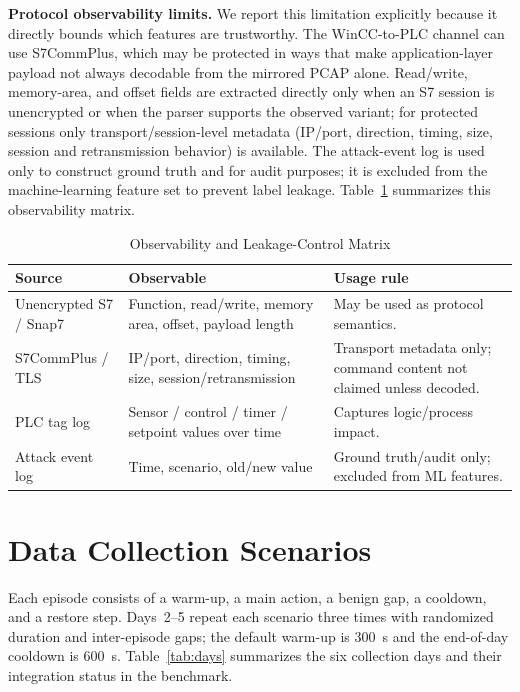 \documentclass[conference]{IEEEtran}
\begin{document}
\textbf{Protocol observability limits.} We report this limitation explicitly because it directly bounds which features are trustworthy. The WinCC-to-PLC channel can use S7CommPlus, which may be protected in ways that make application-layer payload not always decodable from the mirrored PCAP alone. Read/write, memory-area, and offset fields are extracted directly only when an S7 session is unencrypted or when the parser supports the observed variant; for protected sessions only transport/session-level metadata (IP/port, direction, timing, size, session and retransmission behavior) is available. The attack-event log is used only to construct ground truth and for audit purposes; it is excluded from the machine-learning feature set to prevent label leakage. Table~\ref{tab:observability} summarizes this observability matrix.

\begin{table}[t]
\centering
\caption{Observability and Leakage-Control Matrix}
\label{tab:observability}
\begin{tabular}{p{2.2cm}p{2.7cm}p{2.6cm}}
\toprule
\textbf{Source} & \textbf{Observable} & \textbf{Usage rule} \\
\midrule
Unencrypted S7 / Snap7 & Function, read/write, memory area, offset, payload length & May be used as protocol semantics. \\
S7CommPlus / TLS & IP/port, direction, timing, size, session/retransmission & Transport metadata only; command content not claimed unless decoded. \\
PLC tag log & Sensor / control / timer / setpoint values over time & Captures logic/process impact. \\
Attack event log & Time, scenario, old/new value & Ground truth/audit only; excluded from ML features. \\
\bottomrule
\end{tabular}
\end{table}

\section{Data Collection Scenarios}

Each episode consists of a warm-up, a main action, a benign gap, a cooldown, and a restore step. Days~2--5 repeat each scenario three times with randomized duration and inter-episode gaps; the default warm-up is 300~s and the end-of-day cooldown is 600~s. Table~\ref{tab:days} summarizes the six collection days and their integration status in the benchmark.
\end{document}
